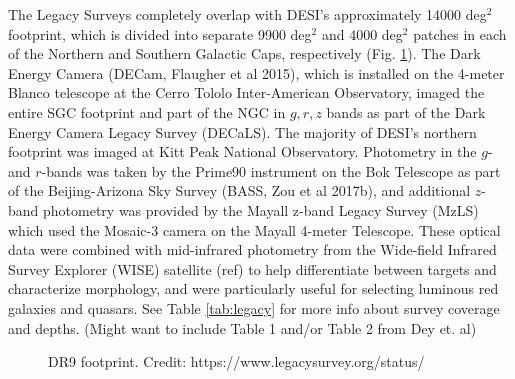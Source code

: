 The Legacy Surveys completely overlap with DESI's approximately 14000 deg$^2$ footprint, which is divided into separate 9900 deg$^2$ and 4000 deg$^2$ patches in each of the Northern and Southern Galactic Caps, respectively (Fig. \ref{fig:footprint}). The Dark Energy Camera (DECam, Flaugher et al 2015), which is installed on the 4-meter Blanco telescope at the Cerro Tololo Inter-American Observatory, imaged the entire SGC footprint and part of the NGC in $g,r,z$ bands as part of the Dark Energy Camera Legacy Survey (DECaLS). The majority of DESI's northern footprint was imaged at Kitt Peak National Observatory. Photometry in the $g$- and $r$-bands was taken by the Prime90 instrument on the Bok Telescope as part of the Beijing-Arizona Sky Survey (BASS, Zou et al 2017b), and additional $z$-band photometry was provided by the Mayall z-band Legacy Survey (MzLS) which used the Mosaic-3 camera on the Mayall 4-meter Telescope. These optical data were combined with mid-infrared photometry from the Wide-field Infrared Survey Explorer (WISE) satellite (ref) to help differentiate between targets and characterize morphology, and were particularly useful for selecting luminous red galaxies and quasars. See Table \ref{tab:legacy} for more info about survey coverage and depths. (Might want to include Table 1 and/or Table 2 from Dey et. al)

\begin{figure}\centering
{}\hfill
{}\par 
{}
\caption{DR9 footprint. Credit: https://www.legacysurvey.org/status/}
\label{fig:footprint}
\end{figure}


